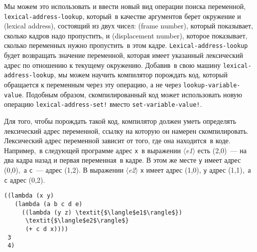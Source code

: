 Мы можем это использовать и ввести новый вид операции
поиска переменной, {\tt lexical-address-lookup},
который~в качестве аргументов берет окружение и 
 (lexical address), состоящий из
двух чисел:  (frame number), который
показывает, сколько кадров надо пропустить, и 
 (displacement number), которое
показывает, сколько переменных нужно пропустить~в этом
кадре. {\tt Lexical-address-lookup} будет возвращать значение
переменной, которая имеет указанный лексический адрес по отношению к
текущему окружению.  Добавив~в свою машину
{\tt lexical-address-look\-up}, мы можем научить компилятор
порождать код, который обращается к переменным через эту операцию, а
не через {\tt lookup-variable-value}.  Подобным образом,
скомпилированный код может использовать новую операцию
{\tt lexical-address-set!} вместо
{\tt set-variable-value!}.

Для того, чтобы порождать такой код, компилятор должен
уметь определять лексический адрес переменной, ссылку на которую он
намерен скомпилировать.  Лексический адрес переменной зависит от того,
где она находится~в коде.  Например,~в следующей программе адрес
{\tt x}~в выражении \textit{$\langle$e1$\rangle$} есть (2,0)~--- на два
кадра назад и первая переменная~в кадре.  В этом же месте
{\tt y} имеет адрес (0,0),~а {\tt c}~--- адрес (1,2).  В
выражении \textit{$\langle$e2$\rangle$} {\tt x} имеет адрес (1,0),
{\tt y} адрес (1,1),~а {\tt c} адрес (0,2).

\begin{Verbatim}[fontsize=\small]
((lambda (x y)
   (lambda (a b c d e)
     ((lambda (y z) \textit{$\langle$e1$\rangle$})
      \textit{$\langle$e2$\rangle$}
      (+ c d x))))
 3
 4)
\end{Verbatim}

